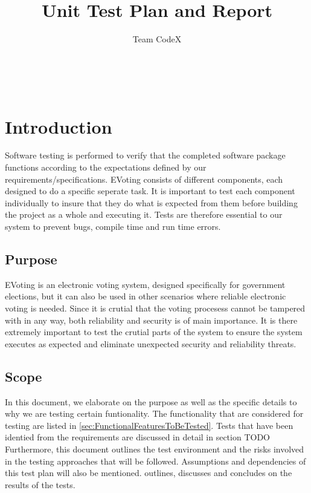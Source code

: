 \documentclass[11pt]{article}
\author{Team CodeX}
\title{Unit Test Plan and Report}
\begin{document}
	\setcounter{tocdepth}{6}
	\setcounter{secnumdepth}{6}
	\setlength{\parskip}{6pt}
	
	
	
	\renewcommand{\thesection}{\arabic{section}}
	\newpage
	
	\tableofcontents
	
	\textsc{}\\[1cm]
	
	\newpage
	
	\section{Introduction}
	Software testing is performed to verify that the completed software package functions according to the expectations defined by our requirements/specifications.\newline
	EVoting consists of different components, each designed to do a specific seperate task. It is important to test each component individually to insure that they do what is expected from them before building the project as a whole and executing it. Tests are therefore essential to our system to prevent bugs, compile time and run time errors.
	
	\subsection{Purpose}
	EVoting is an electronic voting system, designed specifically for government elections, but it can also be used in other scenarios where reliable electronic voting is needed. Since it is crutial that the voting procesess cannot be tampered with in any way, both reliability and security is of main importance. It is there extremely important to test the crutial parts of the system to ensure the system executes as expected and eliminate unexpected security and reliability threats.

	\subsection{Scope}
	In this document, we elaborate on the purpose as well as the specific details to why we are testing certain funtionality. The functionality that are considered for
	testing are listed in \autoref{sec:FunctionalFeaturesToBeTested}. Tests that have been identied from the requirements are discussed in detail in section TODO Furthermore, this document outlines the test environment and the risks involved in the testing approaches that will be followed. Assumptions and
	dependencies of this test plan will also be mentioned.  outlines, discusses and concludes on the results of the tests.
\end{document}
